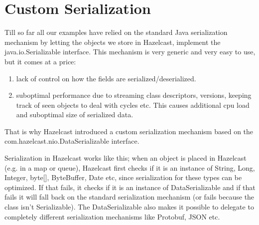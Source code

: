 \chapter{Custom Serialization}
Till so far all our examples have relied on the standard Java serialization mechanism by letting the objects we store in Hazelcast, implement the java.io.Serializable interface. This mechanism is very generic and very easy to use, but it comes at a price:
\begin{enumerate}
\item lack of control on how the fields are serialized/deserialized.
\item suboptimal performance due to streaming class descriptors, versions, keeping track of seen objects to deal with cycles etc. This causes additional cpu load and suboptimal size of serialized data.
\end{enumerate}
That is why Hazelcast introduced a custom serialization mechanism based on the com.hazelcast.nio.DataSerializable interface. 

Serialization in Hazelcast works like this; when an object is placed in Hazelcast (e.g. in a map or queue), Hazelcast first checks if it is an instance of String, Long, Integer, byte[], ByteBuffer, Date etc, since serialization for these types can be optimized. If that fails, it checks if it is an instance of DataSerializable and if that fails it will fall back on the standard serialization mechanism (or fails because the class isn't Serializable). The DataSerializable also makes it possible to delegate to completely different serialization mechanisms like Protobuf, JSON etc.

